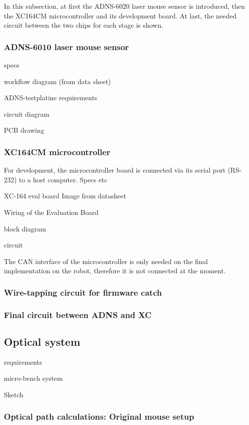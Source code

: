 \documentclass[12pt,a4paper]{article}
\begin{document}
In this subsection, at first the ADNS-6020 laser mouse sensor is introduced, then the XC164CM microcontroller and its development board.
At last, the needed circuit between the two chips for each stage is shown.


\subsubsection{ADNS-6010 laser mouse sensor}

specs

workflow diagram (from data sheet)

ADNS-testplatine
  requirements

  circuit diagram

  PCB drawing

\subsubsection{XC164CM microcontroller}

For development, the microcontroller board is connected via its serial port (RS-232) to a host computer.
Specs etc

XC-164 eval board 
  Image from datasheet

Wiring of the Evaluation Board

  block diagram

  circuit

The CAN interface of the microcontroller is only needed on the final implementation on the robot, therefore it is not connected at the moment.

\subsubsection{Wire-tapping circuit for firmware catch}

\subsubsection{Final circuit between ADNS and XC}

\subsection{Optical system}
\label{optics}
  requirements

micro-bench system

Sketch

\subsubsection{Optical path calculations: Original mouse setup}
\end{document}
